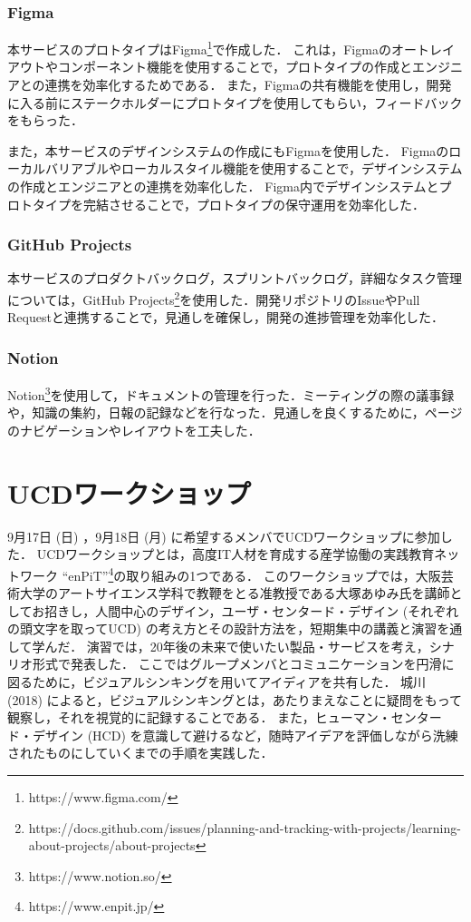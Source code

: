\subsubsection{Figma}
本サービスのプロトタイプはFigma\footnote{https://www.figma.com/}で作成した．
これは，Figmaのオートレイアウトやコンポーネント機能を使用することで，プロトタイプの作成とエンジニアとの連携を効率化するためである．
また，Figmaの共有機能を使用し，開発に入る前にステークホルダーにプロトタイプを使用してもらい，フィードバックをもらった．

また，本サービスのデザインシステムの作成にもFigmaを使用した．
Figmaのローカルバリアブルやローカルスタイル機能を使用することで，デザインシステムの作成とエンジニアとの連携を効率化した．
Figma内でデザインシステムとプロトタイプを完結させることで，プロトタイプの保守運用を効率化した．

\subsubsection{GitHub Projects}
本サービスのプロダクトバックログ，スプリントバックログ，詳細なタスク管理については，GitHub Projects\footnote{https://docs.github.com/issues/planning-and-tracking-with-projects/learning-about-projects/about-projects}を使用した．開発リポジトリのIssueやPull Requestと連携することで，見通しを確保し，開発の進捗管理を効率化した．

\subsubsection{Notion}
Notion\footnote{https://www.notion.so/}を使用して，ドキュメントの管理を行った．ミーティングの際の議事録や，知識の集約，日報の記録などを行なった．見通しを良くするために，ページのナビゲーションやレイアウトを工夫した．

\section{UCDワークショップ}
9月17日 (日) ，9月18日 (月) に希望するメンバでUCDワークショップに参加した．
UCDワークショップとは，高度IT人材を育成する産学協働の実践教育ネットワーク ``enPiT''\footnote{https://www.enpit.jp/}の取り組みの1つである．
このワークショップでは，大阪芸術大学のアートサイエンス学科で教鞭をとる准教授である大塚あゆみ氏を講師としてお招きし，人間中心のデザイン，ユーザ・センタード・デザイン (それぞれの頭文字を取ってUCD) の考え方とその設計方法を，短期集中の講義と演習を通して学んだ．
演習では，20年後の未来で使いたい製品・サービスを考え，シナリオ形式で発表した．
ここではグループメンバとコミュニケーションを円滑に図るために，ビジュアルシンキングを用いてアイディアを共有した．
城川 (2018) によると，ビジュアルシンキングとは，あたりまえなことに疑問をもって観察し，それを視覚的に記録することである\cite{visual}．
また，ヒューマン・センタード・デザイン (HCD) を意識して避けるなど，随時アイデアを評価しながら洗練されたものにしていくまでの手順を実践した．

